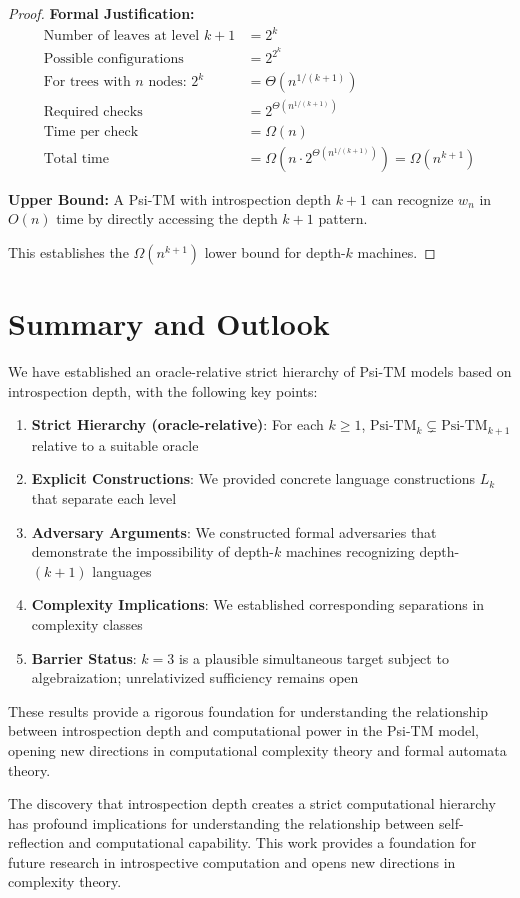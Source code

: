 \begin{proof}
\textbf{Formal Justification:}
\begin{align*}
\text{Number of leaves at level } k+1 &= 2^k \\
\text{Possible configurations} &= 2^{2^k} \\
\text{For trees with } n \text{ nodes: } 2^k &= \Theta(n^{1/(k+1)}) \\
\text{Required checks} &= 2^{\Theta(n^{1/(k+1)})} \\
\text{Time per check} &= \Omega(n) \\
\text{Total time} &= \Omega(n \cdot 2^{\Theta(n^{1/(k+1)})}) = \Omega(n^{k+1})
\end{align*}

\textbf{Upper Bound:}
A Psi-TM with introspection depth $k+1$ can recognize $w_n$ in $O(n)$ time by directly accessing the depth $k+1$ pattern.

This establishes the $\Omega(n^{k+1})$ lower bound for depth-$k$ machines.
\end{proof}

\section{Summary and Outlook}

We have established an oracle-relative strict hierarchy of Psi-TM models based on introspection depth, with the following key points:

\begin{enumerate}
\item \textbf{Strict Hierarchy (oracle-relative)}: For each $k \geq 1$, $\text{Psi-TM}_k \subsetneq \text{Psi-TM}_{k+1}$ relative to a suitable oracle
\item \textbf{Explicit Constructions}: We provided concrete language constructions $L_k$ that separate each level
\item \textbf{Adversary Arguments}: We constructed formal adversaries that demonstrate the impossibility of depth-$k$ machines recognizing depth-$(k+1)$ languages
\item \textbf{Complexity Implications}: We established corresponding separations in complexity classes
\item \textbf{Barrier Status}: $k=3$ is a plausible simultaneous target subject to algebraization; unrelativized sufficiency remains open
\end{enumerate}

These results provide a rigorous foundation for understanding the relationship between introspection depth and computational power in the Psi-TM model, opening new directions in computational complexity theory and formal automata theory.

The discovery that introspection depth creates a strict computational hierarchy has profound implications for understanding the relationship between self-reflection and computational capability. This work provides a foundation for future research in introspective computation and opens new directions in complexity theory.


